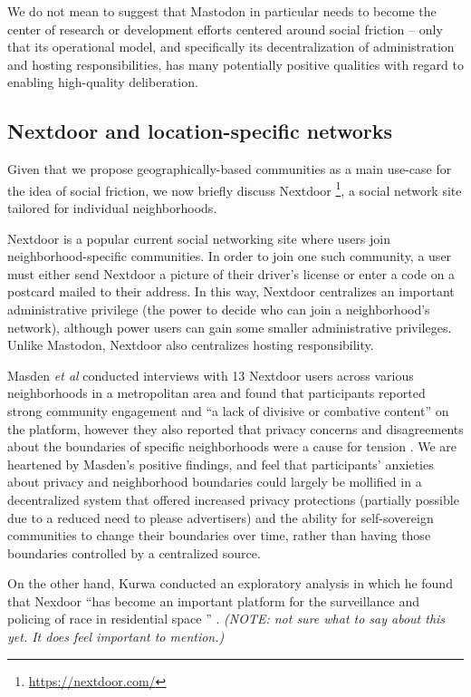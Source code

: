 \documentclass[sigconf,authordraft]{acmart}
\begin{document}
We do not mean to suggest that Mastodon in particular needs to become the center of research or development efforts centered around social friction -- only that its operational model, and specifically its decentralization of administration and hosting responsibilities, has many potentially positive qualities with regard to enabling high-quality deliberation.

\subsection{Nextdoor and location-specific networks}

Given that we propose geographically-based communities as a main use-case for the idea of social friction, we now briefly discuss Nextdoor \footnote{\url{https://nextdoor.com/}}, a social network site tailored for individual neighborhoods.

Nextdoor is a popular current social networking site where users join neighborhood-specific communities. In order to join one such community, a user must either send Nextdoor a picture of their driver's license or enter a code on a postcard mailed to their address. In this way, Nextdoor centralizes an important administrative privilege (the power to decide who can join a neighborhood's network), although power users can gain some smaller administrative privileges. Unlike Mastodon, Nextdoor also centralizes hosting responsibility.

Masden {\itshape et al} conducted interviews with 13 Nextdoor users across various neighborhoods in a metropolitan area and found that participants reported strong community engagement and ``a lack of divisive or combative content'' on the platform, however they also reported that privacy concerns and disagreements about the boundaries of specific neighborhoods were a cause for tension \cite{masden2014tensions}. We are heartened by Masden's positive findings, and feel that participants' anxieties about privacy and neighborhood boundaries could largely be mollified in a decentralized system that offered increased privacy protections (partially possible due to a reduced need to please advertisers) and the ability for self-sovereign communities to change their boundaries over time, rather than having those boundaries controlled by a centralized source.

On the other hand, Kurwa conducted an exploratory analysis in which he found that Nexdoor ``has become an important platform for the surveillance and policing of race in residential space '' \cite{kurwa2019building}. \textit{(NOTE: not sure what to say about this yet. It does feel important to mention.)}
\end{document}
